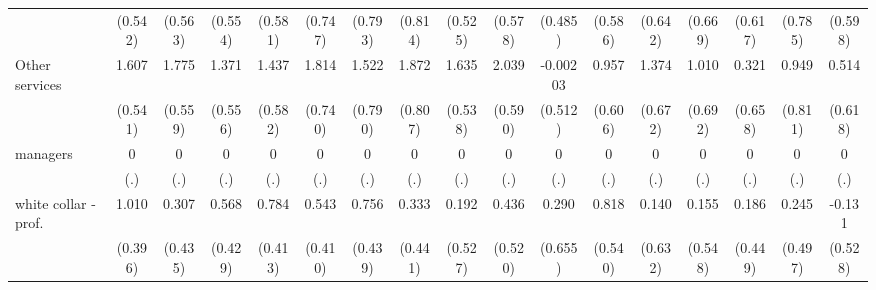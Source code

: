 {\begin{tabular}{l*{16}{c}}
                    &     (0.542)         &     (0.563)         &     (0.554)         &     (0.581)         &     (0.747)         &     (0.793)         &     (0.814)         &     (0.525)         &     (0.578)         &     (0.485)         &     (0.586)         &     (0.642)         &     (0.669)         &     (0.617)         &     (0.785)         &     (0.598)         \\
[1em]
Other services      &       1.607\sym{**} &       1.775\sym{**} &       1.371\sym{*}  &       1.437\sym{*}  &       1.814\sym{*}  &       1.522         &       1.872\sym{*}  &       1.635\sym{**} &       2.039\sym{***}&    -0.00203         &       0.957         &       1.374\sym{*}  &       1.010         &       0.321         &       0.949         &       0.514         \\
                    &     (0.541)         &     (0.559)         &     (0.556)         &     (0.582)         &     (0.740)         &     (0.790)         &     (0.807)         &     (0.538)         &     (0.590)         &     (0.512)         &     (0.606)         &     (0.672)         &     (0.692)         &     (0.658)         &     (0.811)         &     (0.618)         \\
[1em]
managers            &           0         &           0         &           0         &           0         &           0         &           0         &           0         &           0         &           0         &           0         &           0         &           0         &           0         &           0         &           0         &           0         \\
                    &         (.)         &         (.)         &         (.)         &         (.)         &         (.)         &         (.)         &         (.)         &         (.)         &         (.)         &         (.)         &         (.)         &         (.)         &         (.)         &         (.)         &         (.)         &         (.)         \\
[1em]
white collar - prof.&       1.010\sym{*}  &       0.307         &       0.568         &       0.784         &       0.543         &       0.756         &       0.333         &       0.192         &       0.436         &       0.290         &       0.818         &       0.140         &       0.155         &       0.186         &       0.245         &      -0.131         \\
                    &     (0.396)         &     (0.435)         &     (0.429)         &     (0.413)         &     (0.410)         &     (0.439)         &     (0.441)         &     (0.527)         &     (0.520)         &     (0.655)         &     (0.540)         &     (0.632)         &     (0.548)         &     (0.449)         &     (0.497)         &     (0.528)         \\

\end{tabular}}
